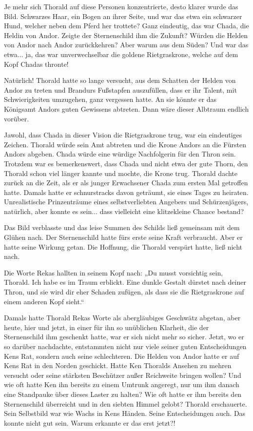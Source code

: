 Je mehr sich Thorald auf diese Personen konzentrierte, desto klarer wurde das Bild. Schwarzes Haar, ein Bogen an ihrer Seite, und war das etwa ein schwarzer Hund, welcher neben dem Pferd her trottete? Ganz eindeutig, das war Chada, die Heldin von Andor. Zeigte der Sternenschild ihm die Zukunft? Würden die Helden von Andor nach Andor zurückkehren? Aber warum aus dem Süden? Und war das etwa... ja, das war unverwechselbar die goldene Rietgraskrone, welche auf dem Kopf Chadas thronte!

Natürlich! Thorald hatte so lange versucht, aus dem Schatten der Helden von Andor zu treten und Brandurs Fußstapfen auszufüllen, dass er ihr Talent, mit Schwierigkeiten umzugehen, ganz vergessen hatte. An sie könnte er das Königsamt Andors guten Gewissens abtreten. Dann wäre dieser Albtraum endlich vorüber.

Jawohl, dass Chada in dieser Vision die Rietgraskrone trug, war ein eindeutiges Zeichen. Thorald würde sein Amt abtreten und die Krone Andors an die Fürsten Andors abgeben. Chada würde eine würdige Nachfolgerin für den Thron sein. Trotzdem war es bemerkenswert, dass Chada und nicht etwa der gute Thorn, den Thorald schon viel länger kannte und mochte, die Krone trug. Thorald dachte zurück an die Zeit, als er als junger Erwachsener Chada zum ersten Mal getroffen hatte. Damals hatte er schnurstracks davon geträumt, sie eines Tages zu heiraten. Unrealistische Prinzenträume eines selbstverliebten Angebers und Schürzenjägers, natürlich, aber konnte es sein... dass vielleicht eine klitzekleine Chance bestand?

Das Bild verblasste und das leise Summen des Schilds ließ gemeinsam mit dem Glühen nach. Der Sternenschild hatte fürs erste seine Kraft verbraucht. Aber er hatte seine Wirkung getan. Die Hoffnung, die Thorald verspürt hatte, ließ nicht nach.

Die Worte Rekas hallten in seinem Kopf nach: „Du musst vorsichtig sein, Thorald. Ich habe es im Traum erblickt. Eine dunkle Gestalt dürstet nach deiner Thron, und sie wird dir eher Schaden zufügen, als dass sie die Rietgraskrone auf einem anderen Kopf sieht.“

Damals hatte Thorald Rekas Worte als abergläubiges Geschwätz abgetan, aber heute, hier und jetzt, in einer für ihn so unüblichen Klarheit, die der Sternenschild ihm geschenkt hatte, war er sich nicht mehr so sicher. Jetzt, wo er so darüber nachdachte, entstammten nicht nur viele seiner guten Entscheidungen Kens Rat, sondern auch seine schlechteren. Die Helden von Andor hatte er auf Kens Rat in den Norden geschickt. Hatte Ken Thoralds Ansehen zu mehren versucht oder seine stärksten Beschützer außer Reichweite bringen wollen? Und wie oft hatte Ken ihn bereits zu einem Umtrunk angeregt, nur um ihm danach eine Standpauke über dieses Laster zu halten? Wie oft hatte er ihm bereits den Sternenschild überreicht und in den siebten Himmel gelobt? Thorald erschauerte. Sein Selbstbild war wie Wachs in Kens Händen. Seine Entscheidungen auch. Das konnte nicht gut sein. Warum erkannte er das erst jetzt?!

